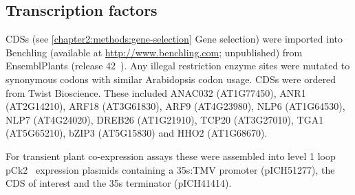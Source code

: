 \documentclass[../main.tex]{subfiles}
\begin{document}
\subsection{Transcription factors}\label{chapter2:methods:synthetic-transcription-factors}

CDSs (see \autoref{chapter2:methods:gene-selection} Gene selection) were imported into Benchling (available at \url{http://www.benchling.com}; unpublished) from EnsemblPlants (release 42~\autocite{kerseyEnsemblGenomes20182018}).
Any illegal restriction enzyme sites were mutated to synonymous codons with similar Arabidopsis codon usage.
CDSs were ordered from Twist Bioscience.
These included ANAC032 (AT1G77450), ANR1 (AT2G14210), ARF18 (AT3G61830), ARF9 (AT4G23980), NLP6 (AT1G64530), NLP7 (AT4G24020), DREB26 (AT1G21910), TCP20 (AT3G27010), TGA1 (AT5G65210), bZIP3 (AT5G15830) and HHO2 (AT1G68670).

For transient plant co\hyp{}expression assays these were assembled into level 1 loop pCk2~\autocite{pollakLoopAssemblySimple2018} expression plasmids containing a 35s:TMV promoter (pICH51277), the CDS of interest and the 35s terminator (pICH41414).


\end{document}
